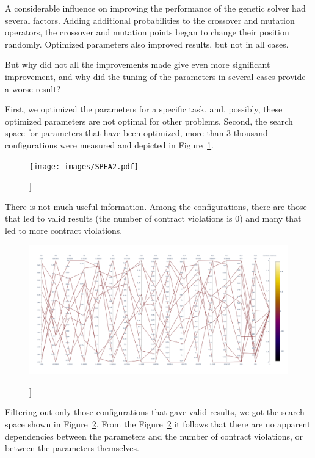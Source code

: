 A considerable influence on improving the performance of the genetic solver had several factors. Adding additional probabilities to the crossover and mutation operators, the crossover and mutation points began to change their position randomly.
Optimized parameters also improved results, but not in all cases.

But why did not all the improvements made give even more significant improvement, and why did the tuning of the parameters in several cases provide a worse result?

First, we optimized the parameters for a specific task, and, possibly, these optimized parameters are not optimal for other problems.
Second, the search space for parameters that have been optimized, more than 3 thousand configurations were measured and depicted in Figure~\ref{fig:SearchSpaceViewFull}.

\begin{figure}
	\centering
	\texttt{[image: images/SPEA2.pdf]}
	\caption[]]{}
	\label{fig:SearchSpaceViewFull}
\end{figure}

There is not much useful information. Among the configurations, there are those that led to valid results (the number of contract violations is 0) and many that led to more contract violations.

\begin{figure}
	\centering
	\includegraphics[width=\textwidth]{images/SPEA2_Zero_validity.html.pdf}
	\caption[]]{}
	\label{fig:SearchSpaceValid}
\end{figure}

Filtering out only those configurations that gave valid results, we got the search space shown in Figure~\ref{fig:SearchSpaceValid}. From the Figure~\ref{fig:SearchSpaceValid} it follows that there are no apparent dependencies between the parameters and the number of contract violations, or between the parameters themselves.

